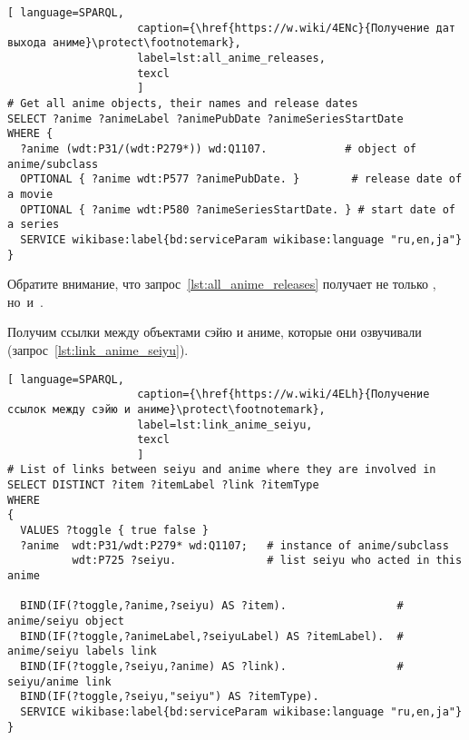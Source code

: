 \begin{lstlisting}[ language=SPARQL, 
                    caption={\href{https://w.wiki/4ENc}{Получение дат выхода аниме}\protect\footnotemark},
                    label=lst:all_anime_releases,
                    texcl 
                    ]
# Get all anime objects, their names and release dates
SELECT ?anime ?animeLabel ?animePubDate ?animeSeriesStartDate
WHERE {
  ?anime (wdt:P31/(wdt:P279*)) wd:Q1107.            # object of anime/subclass
  OPTIONAL { ?anime wdt:P577 ?animePubDate. }        # release date of a movie
  OPTIONAL { ?anime wdt:P580 ?animeSeriesStartDate. } # start date of a series
  SERVICE wikibase:label{bd:serviceParam wikibase:language "ru,en,ja"}
}
\end{lstlisting}%

Обратите внимание, что запрос~\ref{lst:all_anime_releases} 
получает не только , но~и~. 

Получим ссылки между объектами сэйю и аниме, которые они озвучивали (запрос~\ref{lst:link_anime_seiyu}).

\begin{lstlisting}[ language=SPARQL, 
                    caption={\href{https://w.wiki/4ELh}{Получение ссылок между сэйю и аниме}\protect\footnotemark},
                    label=lst:link_anime_seiyu,
                    texcl 
                    ]
# List of links between seiyu and anime where they are involved in
SELECT DISTINCT ?item ?itemLabel ?link ?itemType
WHERE
{
  VALUES ?toggle { true false }
  ?anime  wdt:P31/wdt:P279* wd:Q1107;   # instance of anime/subclass
          wdt:P725 ?seiyu.              # list seiyu who acted in this anime
  
  BIND(IF(?toggle,?anime,?seiyu) AS ?item).                 # anime/seiyu object
  BIND(IF(?toggle,?animeLabel,?seiyuLabel) AS ?itemLabel).  # anime/seiyu labels link
  BIND(IF(?toggle,?seiyu,?anime) AS ?link).                 # seiyu/anime link
  BIND(IF(?toggle,?seiyu,"seiyu") AS ?itemType).
  SERVICE wikibase:label{bd:serviceParam wikibase:language "ru,en,ja"}
}
\end{lstlisting}%


